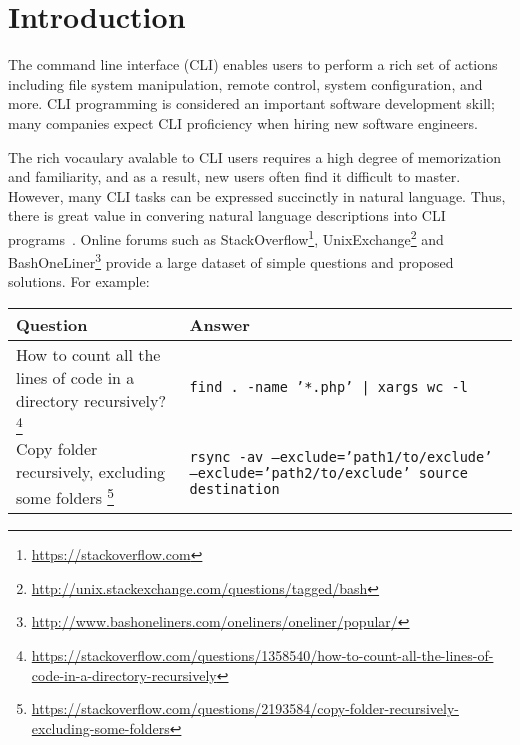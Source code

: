 \section{Introduction}


The command line interface (CLI) enables users to perform a rich set of actions including file system manipulation, remote control, system configuration, and more. CLI programming is considered an important software development skill; many companies expect CLI proficiency when hiring new software engineers.

The rich vocaulary avalable to CLI users requires a high degree of memorization and familiarity, and as a result, new users often find it difficult to master. However, many CLI tasks can be expressed succinctly in natural language. Thus, there is great value in convering natural language descriptions into CLI programs~\cite{Pederson-Report,Manaris:1994:DNL:198125.198137,ZOLTANFORD1991527}. Online forums such as StackOverflow\footnote{\url{https://stackoverflow.com}}, UnixExchange\footnote{\url{http://unix.stackexchange.com/questions/tagged/bash}} and BashOneLiner\footnote{\url{http://www.bashoneliners.com/oneliners/oneliner/popular/}} provide a large dataset of simple questions and proposed solutions. For example:

\begin{center}
\begin{tabular}{p{3in}p{3in}}
    \textbf{Question} & \textbf{Answer} \\
    \hline \hline
    How to count all the lines of code in a directory recursively?%
        \footnote{\url{https://stackoverflow.com/questions/1358540/how-to-count-all-the-lines-of-code-in-a-directory-recursively}} &
        \texttt{find . -name '*.php' | xargs wc -l} \\
    \hline
    Copy folder recursively, excluding some folders%
        \footnote{\url{https://stackoverflow.com/questions/2193584/copy-folder-recursively-excluding-some-folders}} &
        \texttt{rsync -av --exclude='path1/to/exclude' --exclude='path2/to/exclude' source destination} \\
\end{tabular}
\end{center}

